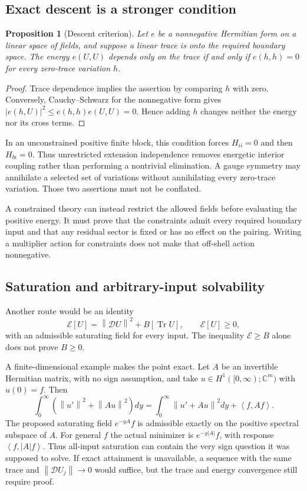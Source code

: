 \documentclass[11pt]{article}
\numberwithin{equation}{section}
\newtheorem{proposition}[theorem]{Proposition}
\theoremstyle{definition}
\theoremstyle{remark}
\newcommand{\C}{\mathbb C}
\newcommand{\norm}[1]{\left\lVert#1\right\rVert}
\newcommand{\ip}[2]{\left\langle#1,#2\right\rangle}
\begin{document}
\subsection{Exact descent is a stronger condition}
\begin{proposition}[Descent criterion]
Let $e$ be a nonnegative Hermitian form on a linear space of fields, and suppose a linear trace is onto the required boundary space. The energy $e(U,U)$ depends only on the trace if and only if $e(h,h)=0$ for every zero-trace variation $h$.
\end{proposition}
\begin{proof}
Trace dependence implies the assertion by comparing $h$ with zero. Conversely, Cauchy--Schwarz for the nonnegative form gives $|e(h,U)|^2\le e(h,h)e(U,U)=0$. Hence adding $h$ changes neither the energy nor its cross terms.
\end{proof}
In an unconstrained positive finite block, this condition forces $H_{ii}=0$ and then $H_{bi}=0$. Thus unrestricted extension independence removes energetic interior coupling rather than performing a nontrivial elimination. A gauge symmetry may annihilate a selected set of variations without annihilating every zero-trace variation. Those two assertions must not be conflated.

A constrained theory can instead restrict the allowed fields before evaluating the positive energy. It must prove that the constraints admit every required boundary input and that any residual sector is fixed or has no effect on the pairing. Writing a multiplier action for constraints does not make that off-shell action nonnegative.

\subsection{Saturation and arbitrary-input solvability}
Another route would be an identity
\begin{equation}
 \mathcal E[U]=\norm{\mathcal D U}^2+B[\operatorname{Tr}U],
 \qquad \mathcal E[U]\ge0,
 \label{eq:saturation}
\end{equation}
with an admissible saturating field for every input. The inequality $\mathcal E\ge B$ alone does not prove $B\ge0$.

A finite-dimensional example makes the point exact. Let $A$ be an invertible Hermitian matrix, with no sign assumption, and take $u\in H^1([0,\infty);\C^m)$ with $u(0)=f$. Then
\begin{equation}
 \int_0^\infty(\norm{u'}^2+\norm{Au}^2)dy
 =\int_0^\infty\norm{u'+Au}^2dy+\ip{f}{Af}.
\end{equation}
The proposed saturating field $e^{-yA}f$ is admissible exactly on the positive spectral subspace of $A$. For general $f$ the actual minimizer is $e^{-y|A|}f$, with response $\ip{f}{|A|f}$. Thus all-input saturation can contain the very sign question it was supposed to solve. If exact attainment is unavailable, a sequence with the same trace and $\norm{\mathcal DU_j}\to0$ would suffice, but the trace and energy convergence still require proof.
\end{document}
